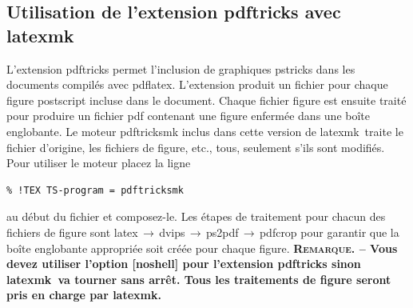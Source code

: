 \documentclass[11pt,french]{article}
\newcommand{\latexmk}{\textsf{latexmk}}
\newcommand{\cmd}[1]{\textsf{#1}}
\newcommand{\To}{\,\(\to\)\,}
\begin{document}

%

\subsection{Utilisation de l'extension \cmd{pdftricks} avec \latexmk}

L'extension \cmd{pdftricks} permet l'inclusion de graphiques \cmd{pstricks} dans les documents compilés avec \cmd{pdflatex}. L'extension produit un fichier pour chaque figure postscript incluse dans le document. Chaque fichier figure est ensuite traité pour produire un fichier \cmd{pdf} contenant une figure enfermée dans une boîte englobante. Le moteur \cmd{pdftricksmk} inclus dans cette version de \latexmk\ traite le fichier d'origine, les fichiers de figure, etc., tous, seulement s'ils sont modifiés. Pour utiliser le moteur placez la ligne
\begin{verbatim}
% !TEX TS-program = pdftricksmk
\end{verbatim}
au début du fichier et composez-le. Les étapes de traitement pour chacun des fichiers de figure sont \cmd{latex}\To\cmd{dvips}\To\cmd{ps2pdf}\To\cmd{pdfcrop} pour garantir que la boîte englobante appropriée soit créée pour chaque figure. \textbf{\textsc{Remarque}. -- Vous devez utiliser l'option [\cmd{noshell}] pour l'extension \cmd{pdftricks} sinon \latexmk\ va tourner sans arrêt. Tous les traitements de figure seront pris en charge par \latexmk.}
\end{document}
